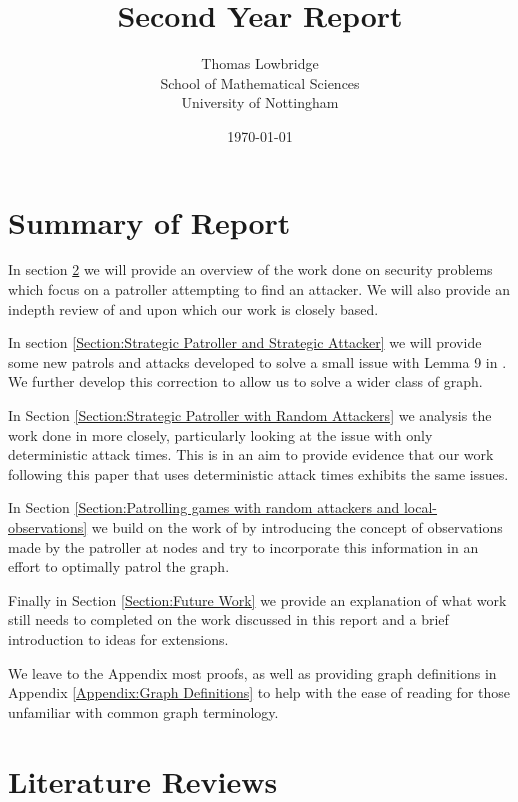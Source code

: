 \documentclass[a4paper,10pt]{article}
\title{Second Year Report}
\date{\today}
\author{Thomas Lowbridge \\ School of Mathematical Sciences \\ University of Nottingham}
\theoremstyle{definition}
\theoremstyle{definition}
\theoremstyle{remark}
\theoremstyle{definition}
\begin{document}
\pagestyle{empty}
{
  \renewcommand{\thispagestyle}[1]{}
  \maketitle
  \tableofcontents  
}
\clearpage
\pagestyle{plain}


\setlength{\parindent}{0pt}
\setlength{\parskip}{1em}

\newpage
{}

\section{Summary of Report}
In section \ref{Section:Literature Reviews} we will provide an overview of the work done on security problems which focus on a patroller attempting to find an attacker. We will also provide an indepth review of \cite{Alpern2011} and \cite{Lin2013} upon which our work is closely based.

In section \ref{Section:Strategic Patroller and Strategic Attacker} we will provide some new patrols and attacks developed to solve a small issue with Lemma 9 in \cite{Alpern2011}. We further develop this correction to allow us to solve a wider class of graph.

In Section \ref{Section:Strategic Patroller with Random Attackers} we analysis the work done in \cite{Alpern2011} more closely, particularly looking at the issue with only deterministic attack times. This is in an aim to provide evidence that our work following this paper that uses deterministic attack times exhibits the same issues.

In Section \ref{Section:Patrolling games with random attackers and local-observations} we build on the work of \cite{Lin2013} by introducing the concept of observations made by the patroller at nodes and try to incorporate this information in an effort to optimally patrol the graph.

Finally in Section \ref{Section:Future Work} we provide an explanation of what work still needs to completed on the work discussed in this report and a brief introduction to ideas for extensions. 

We leave to the Appendix most proofs, as well as providing graph definitions in Appendix \ref{Appendix:Graph Definitions} to help with the ease of reading for those unfamiliar with common graph terminology.

\section{Literature Reviews}
\label{Section:Literature Reviews}
\end{document}

